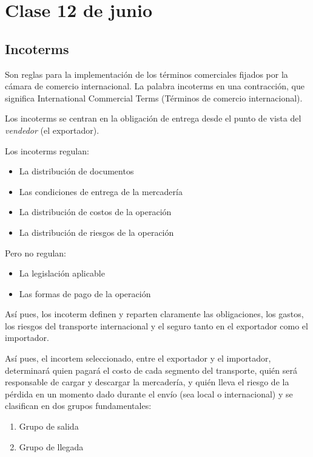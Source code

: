 \section{Clase 12 de junio}

\subsection{Incoterms}

Son reglas para la implementación de los términos comerciales fijados por la 
cámara de comercio internacional. 
La palabra incoterms en una contracción,
que significa International Commercial Terms
(Términos de comercio internacional).

Los incoterms se centran en la obligación de entrega desde el punto de vista del
\textit{vendedor} (el exportador).

Los incoterms regulan:
\begin{itemize}
      \item La distribución de documentos
      \item Las condiciones de entrega de la mercadería
      \item La distribución de costos de la operación
      \item La distribución de riesgos de la operación 
\end{itemize}

Pero no regulan:
\begin{itemize}
      \item La legislación aplicable
      \item Las formas de pago de la operación 
\end{itemize}

Así pues, 
los incoterm definen y reparten claramente las obligaciones, 
los gastos, 
los riesgos del transporte internacional 
y el seguro tanto en el exportador como el importador.

Así pues, el incortem seleccionado,
entre el exportador y el importador,
determinará quien pagará el costo de cada segmento del transporte,
quién será responsable de cargar y descargar la mercadería,
y quién lleva el riesgo de la pérdida en un momento dado durante el envío
(sea local o internacional)
y se clasifican en dos grupos fundamentales:
\begin{enumerate}
      \item Grupo de salida
      \item Grupo de llegada
\end{enumerate}

